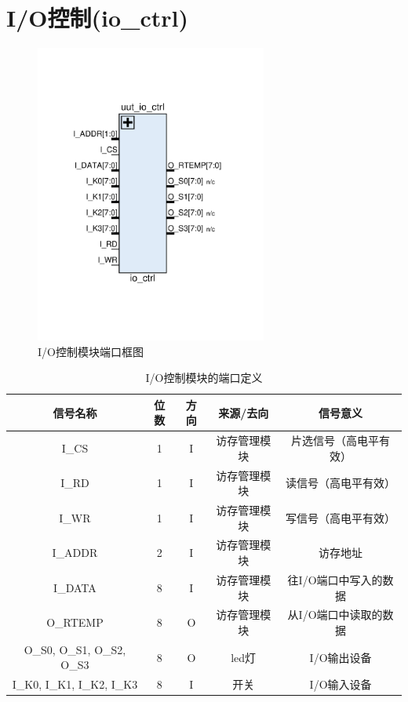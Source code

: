 \documentclass[forprint]{WHUBachelor}
\begin{document}
\section{I/O控制(io\_ctrl)}

\begin{figure}[H]
  \centering
  \includegraphics[width=3in]{figures/ports/io_ctrl.pdf}
  \caption{I/O控制模块端口框图}
  \label{fig:ports:ram_ctrl}
\end{figure}

\begin{table}[H]
  \centering
  \begin{tabular}{c c c c c}
    \hline
    信号名称 & 位数 & 方向 & 来源/去向 & 信号意义 \\
    \hline
    I\_CS & 1 & I & 访存管理模块 & 片选信号（高电平有效） \\
    I\_RD & 1 & I & 访存管理模块 & 读信号（高电平有效） \\
    I\_WR & 1 & I & 访存管理模块 & 写信号（高电平有效） \\
    I\_ADDR & 2 & I & 访存管理模块 & 访存地址 \\
    I\_DATA & 8 & I & 访存管理模块 & 往I/O端口中写入的数据 \\
    O\_RTEMP & 8 & O & 访存管理模块 & 从I/O端口中读取的数据 \\
    O\_S0, O\_S1, O\_S2, O\_S3 & 8 & O & led灯 & I/O输出设备\\
    I\_K0, I\_K1, I\_K2, I\_K3 & 8 & I & 开关 & I/O输入设备\\
    \hline
  \end{tabular}
  \caption{I/O控制模块的端口定义}
  \label{tab:ports:io_ctrl}
\end{table}
\end{document}
